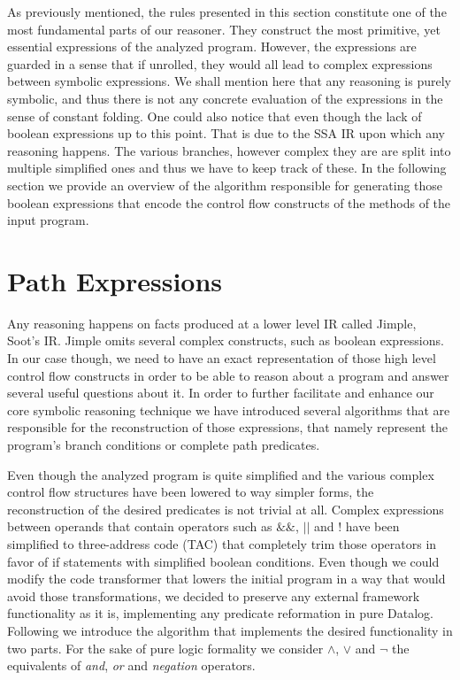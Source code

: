 As previously mentioned, the rules presented in this section constitute
one of the most fundamental parts of our reasoner. They construct the
most primitive, yet essential expressions of the analyzed program. However,
the expressions are guarded in a sense that if unrolled, they would all
lead to complex expressions between symbolic expressions. We shall mention
here that any reasoning is purely symbolic, and thus there is not any concrete
evaluation of the expressions in the sense of constant folding. One could also
notice that even though the lack of boolean expressions up to this point. That
is due to the SSA IR upon which any reasoning happens. The various branches,
however complex they are are split into multiple simplified ones and thus we
have to keep track of these. In the following section we provide an overview of
the algorithm responsible for generating those boolean expressions that encode
the control flow constructs of the methods of the input program.

\section{Path Expressions}

Any \doop{} reasoning happens on facts produced at a lower level IR
called Jimple, Soot's IR. Jimple omits several complex constructs,
such as boolean expressions. In our case though, we need to have an exact
representation of those high level control flow constructs in order to be
able to reason about a program and answer several useful questions about
it. In order to further facilitate and enhance our core symbolic reasoning
technique we have introduced several algorithms that are responsible for the
reconstruction of those expressions, that namely represent the program's branch
conditions or complete path predicates.


Even though the analyzed program is quite simplified and the various complex
control flow structures have been lowered to way simpler forms, the reconstruction
of the desired predicates is not trivial at all. Complex expressions between operands
that contain operators such as $\&\&$, $||$ and $!$ have been simplified
to three-address code (TAC) that completely trim those operators in favor of
if statements with simplified boolean conditions. Even though we could modify
the code transformer that lowers the initial program in a way that would avoid those
transformations, we decided to preserve any external framework functionality as
it is, implementing any predicate reformation in pure Datalog. Following
we introduce the algorithm that implements the desired functionality in two parts.
For the sake of pure logic formality we consider $\land$, $\lor$ and $\neg$ the equivalents of
\emph{and}, \emph{or} and \emph{negation} operators.

